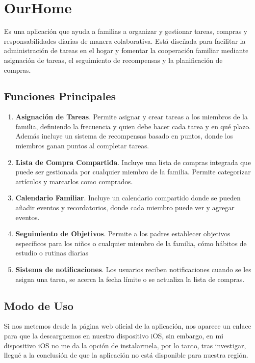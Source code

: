 \documentclass{article}
\begin{document}
\section{OurHome}
Es una aplicación que ayuda a familias a organizar y gestionar tareas, compras y responsabilidades diarias de manera colaborativa. 
Está diseñada para facilitar la administración de tareas en el hogar y fomentar la cooperación familiar mediante asignación de tareas, 
el seguimiento de recompensas y la planificación de compras. 

\subsection{Funciones Principales}

\begin{enumerate}
    \item  \textbf{Asignación de Tareas}. Permite asignar y crear tareas a los miembros de la familia, definiendo la frecuencia y quien debe hacer cada tarea y en qué plazo.
    Además incluye un sistema de recompensas basado en puntos, donde los miembros ganan puntos al completar tareas.
    \item \textbf{Lista de Compra Compartida}. Incluye una lista de compras integrada que puede ser gestionada por cualquier miembro de la familia. Permite categorizar artículos y marcarlos como comprados.
    \item \textbf{Calendario Familiar}. Incluye un calendario compartido donde se pueden añadir eventos y recordatorios, donde cada miembro puede ver y agregar eventos.
    \item \textbf{Seguimiento de Objetivos}. Permite a los padres establecer objetivos específicos para los niños o cualquier miembro de la familia, cómo hábitos de estudio o rutinas diarias 
    \item \textbf{Sistema de notificaciones}. Los usuarios reciben notificaciones cuando se les asigna una tarea, se acerca la fecha límite o se actualiza la lista de compras.
\end{enumerate}

\subsection{Modo de Uso}
Si nos metemos desde la página web oficial de la aplicación, nos aparece un enlace para que la descarguemos en nuestro dispositivo iOS, 
sin embargo, en mi dispositivo iOS no me da la opción de instalarmela, por lo tanto, tras investigar, llegué a la conclusión de que la aplicación no 
está disponible para nuestra región.
\end{document}

